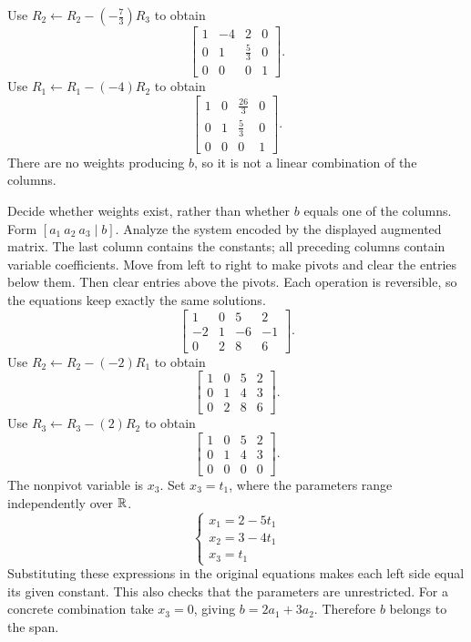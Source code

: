 Use $R_{2}\leftarrow R_{2}-(- \frac{7}{3})R_{3}$ to obtain
\[ \left[\begin{array}{rrr|r}1&-4&2&0\\0&1&\frac{5}{3}&0\\0&0&0&1\end{array}\right].\]
Use $R_{1}\leftarrow R_{1}-(-4)R_{2}$ to obtain
\[ \left[\begin{array}{rrr|r}1&0&\frac{26}{3}&0\\0&1&\frac{5}{3}&0\\0&0&0&1\end{array}\right].\]
There are no weights producing $b$, so it is not a linear combination of the columns.

\goal Decide whether weights exist, rather than whether $b$ equals one of the columns. Form $[a_1\ a_2\ a_3\mid b]$.
\goal Analyze the system encoded by the displayed augmented matrix. The last column contains the constants; all preceding columns contain variable coefficients.
\idea Move from left to right to make pivots and clear the entries below them. Then clear entries above the pivots. Each operation is reversible, so the equations keep exactly the same solutions.
\[ \left[\begin{array}{rrr|r}1&0&5&2\\-2&1&-6&-1\\0&2&8&6\end{array}\right].\]
Use $R_{2}\leftarrow R_{2}-(-2)R_{1}$ to obtain
\[ \left[\begin{array}{rrr|r}1&0&5&2\\0&1&4&3\\0&2&8&6\end{array}\right].\]
Use $R_{3}\leftarrow R_{3}-(2)R_{2}$ to obtain
\[ \left[\begin{array}{rrr|r}1&0&5&2\\0&1&4&3\\0&0&0&0\end{array}\right].\]
The nonpivot variable is $x_{3}$. Set $x_{3}=t_{1}$, where the parameters range independently over $\mathbb{R}$.
\[ \begin{cases}x_{1}=2 - 5 t_{1}\\x_{2}=3 - 4 t_{1}\\x_{3}=t_{1}\end{cases}\]
Substituting these expressions in the original equations makes each left side equal its given constant. This also checks that the parameters are unrestricted.
For a concrete combination take $x_3=0$, giving $b=2a_1+3a_2$. Therefore $b$ belongs to the span.

